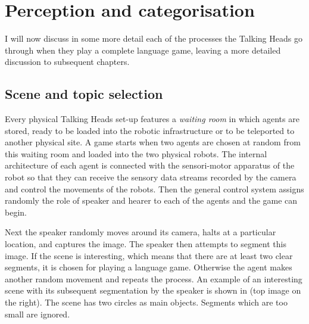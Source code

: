 \section{Perception and categorisation}

I will now discuss in some more detail each of the processes
the Talking Heads go through when they 
play a complete language game, leaving a more detailed 
discussion to subsequent chapters.

\subsection{Scene and topic selection}

Every physical Talking Heads set-up features a {\it waiting room} in 
which agents are stored, ready to be loaded into the 
robotic infrastructure or to be teleported to another
physical site. A game starts when two agents are chosen
at random from this waiting room and loaded into 
the two physical robots. The
internal architecture of each agent is connected with 
the sensori-motor apparatus of the robot so that they can 
receive the sensory data streams recorded by the camera
and control the movements of the robots. Then the general 
control system assigns randomly the role of speaker and hearer
to each of the agents and the game can begin. 

Next the speaker randomly moves around its camera, halts 
at a particular location, and captures
the image. The speaker then attempts to segment 
this image. If the scene is interesting, which means that
there are at least two clear segments, it is chosen 
for playing a language game. Otherwise the agent makes another 
random movement and repeats the process. An example of 
an interesting scene with its subsequent segmentation
by the speaker is shown in  (top image on the right). The scene
has two circles as main objects. Segments which are too 
small are ignored. 


